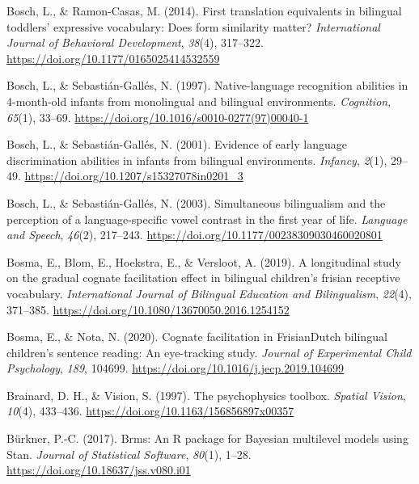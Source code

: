 \documentclass[
  12pt,
  b5paperpaper,
  twoside]{scrreprt}
\newlength{\cslhangindent}
\newlength{\cslentryspacingunit} %
\newenvironment{CSLReferences}[2] %
 {%
  \setlength{\parindent}{0pt}
  \ifodd #1
  \let\oldpar\par
  \def\par{\hangindent=\cslhangindent\oldpar}
  \fi
  \setlength{\parskip}{#2\cslentryspacingunit}
 }%
 {}
\begin{document}
\begin{CSLReferences}{1}{0}
\leavevmode{}%
Bosch, L., \& Ramon-Casas, M. (2014). First translation equivalents in
bilingual toddlers' expressive vocabulary: Does form similarity matter?
\emph{International Journal of Behavioral Development}, \emph{38}(4),
317--322. \url{https://doi.org/10.1177/0165025414532559}

\leavevmode{}%
Bosch, L., \& Sebastián-Gallés, N. (1997). Native-language recognition
abilities in 4-month-old infants from monolingual and bilingual
environments. \emph{Cognition}, \emph{65}(1), 33--69.
\url{https://doi.org/10.1016/s0010-0277(97)00040-1}

\leavevmode{}%
Bosch, L., \& Sebastián-Gallés, N. (2001). Evidence of early language
discrimination abilities in infants from bilingual environments.
\emph{Infancy}, \emph{2}(1), 29--49.
\url{https://doi.org/10.1207/s15327078in0201_3}

\leavevmode{}%
Bosch, L., \& Sebastián-Gallés, N. (2003). Simultaneous bilingualism and
the perception of a language-specific vowel contrast in the first year
of life. \emph{Language and Speech}, \emph{46}(2), 217--243.
\url{https://doi.org/10.1177/00238309030460020801}

\leavevmode{}%
Bosma, E., Blom, E., Hoekstra, E., \& Versloot, A. (2019). A
longitudinal study on the gradual cognate facilitation effect in
bilingual children's frisian receptive vocabulary. \emph{International
Journal of Bilingual Education and Bilingualism}, \emph{22}(4),
371--385. \url{https://doi.org/10.1080/13670050.2016.1254152}

\leavevmode{}%
Bosma, E., \& Nota, N. (2020). Cognate facilitation in
{Frisian}{\textendash}{Dutch} bilingual children's sentence reading: An
eye-tracking study. \emph{Journal of Experimental Child Psychology},
\emph{189}, 104699. \url{https://doi.org/10.1016/j.jecp.2019.104699}

\leavevmode{}%
Brainard, D. H., \& Vision, S. (1997). The psychophysics toolbox.
\emph{Spatial Vision}, \emph{10}(4), 433--436.
\url{https://doi.org/10.1163/156856897x00357}

\leavevmode{}%
Bürkner, P.-C. (2017). Brms: An {R} package for {Bayesian} multilevel
models using {Stan}. \emph{Journal of Statistical Software},
\emph{80}(1), 1--28. \url{https://doi.org/10.18637/jss.v080.i01}


\end{CSLReferences}
\end{document}
